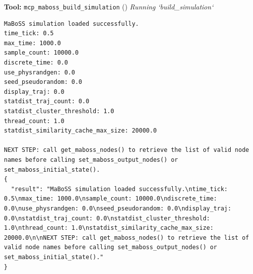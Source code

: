 \documentclass[11pt,a4paper]{article}
\begin{document}
\begin{toolokbox}
\textbf{Tool:} \texttt{mcp\_maboss\_build\_simulation} (\checkmark)
\textit{Running `build\_simulation`}
\begin{lstlisting}
MaBoSS simulation loaded successfully.
time_tick: 0.5
max_time: 1000.0
sample_count: 10000.0
discrete_time: 0.0
use_physrandgen: 0.0
seed_pseudorandom: 0.0
display_traj: 0.0
statdist_traj_count: 0.0
statdist_cluster_threshold: 1.0
thread_count: 1.0
statdist_similarity_cache_max_size: 20000.0

NEXT STEP: call get_maboss_nodes() to retrieve the list of valid node names before calling set_maboss_output_nodes() or set_maboss_initial_state().
{
  "result": "MaBoSS simulation loaded successfully.\ntime_tick: 0.5\nmax_time: 1000.0\nsample_count: 10000.0\ndiscrete_time: 0.0\nuse_physrandgen: 0.0\nseed_pseudorandom: 0.0\ndisplay_traj: 0.0\nstatdist_traj_count: 0.0\nstatdist_cluster_threshold: 1.0\nthread_count: 1.0\nstatdist_similarity_cache_max_size: 20000.0\n\nNEXT STEP: call get_maboss_nodes() to retrieve the list of valid node names before calling set_maboss_output_nodes() or set_maboss_initial_state()."
}
\end{lstlisting}
\end{toolokbox}
\end{document}
